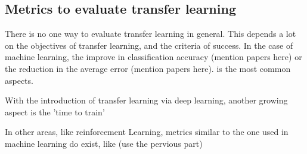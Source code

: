 
  \subsection{Metrics to evaluate transfer learning}
    \par There is no one way to evaluate transfer learning in general. This depends a lot on the objectives of transfer learning, and the criteria of success. In the case of machine learning, the improve in classification accuracy (mention papers here) or the reduction in the average error (mention papers here). is the most common aspects.
    \par With the introduction of transfer learning via deep learning, another growing aspect is the 'time to train'
    \par In other areas, like reinforcement Learning, metrics similar to the one used in machine learning do exist, like (use the pervious part)

